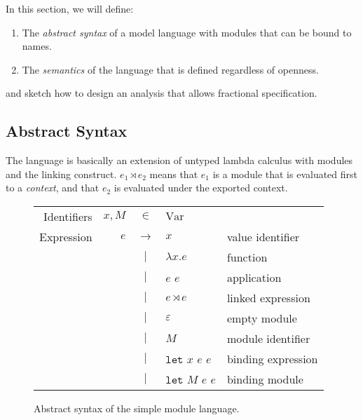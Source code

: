 \documentclass{article}
\theoremstyle{definition}
\newcommand*{\vbar}{|}
\newcommand*{\ExprVar}{\text{Var}}
\newcommand*{\link}[2]{{#1}\rtimes{#2}}
\newcommand*{\Let}{\mathtt{let}}
\begin{document}
In this section, we will define:
\begin{enumerate}
  \item The \emph{abstract syntax} of a model language with modules that can be bound to names.
  \item The \emph{semantics} of the language that is defined regardless of openness.
\end{enumerate}
and sketch how to design an analysis that allows fractional specification.
\subsection{Abstract Syntax}
The language is basically an extension of untyped lambda calculus with modules and the linking construct.
$\link{e_1}{e_2}$ means that $e_1$ is a module that is evaluated first to a \emph{context}, and that $e_2$ is evaluated under the exported context.

\begin{figure}[htb]
  \centering
  \begin{tabular}{rrcll}
    Identifiers & $x,M$ & $\in$         & $\ExprVar$                              \\
    Expression  & $e$   & $\rightarrow$ & $x$                & value identifier   \\
                &       & $\vbar$       & $\lambda x.e$      & function           \\
                &       & $\vbar$       & $e$ $e$            & application        \\
                &       & $\vbar$       & $\link{e}{e}$      & linked expression  \\
                &       & $\vbar$       & $\varepsilon$      & empty module       \\
                &       & $\vbar$       & $M$                & module identifier  \\
                &       & $\vbar$       & $\Let$ $x$ $e$ $e$ & binding expression \\
                &       & $\vbar$       & $\Let$ $M$ $e$ $e$ & binding module     \\
  \end{tabular}
  \caption{Abstract syntax of the simple module language.}
  \label{fig:syntax}
\end{figure}
\end{document}
